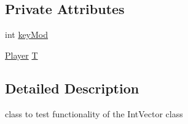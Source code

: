 \subsection*{Private Attributes}
\begin{DoxyCompactItemize}
\item 
int \hyperlink{classPlayerTest_ae4e634b9de6e1a835fead6433fb68108}{key\-Mod}
\item 
\hyperlink{classPlayer}{Player} \hyperlink{classPlayerTest_aa4d4751434ca1508f9962ffc03c37447}{T}
\end{DoxyCompactItemize}


\subsection{Detailed Description}
class to test functionality of the Int\-Vector class 

